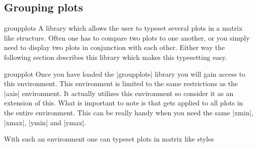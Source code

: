 \subsection{Grouping plots}
\label{sec:group:plot}

{}

%


\begin{pgfplotslibrary}{groupplots}
  A library which allows the user to typeset several plots in a matrix like structure.
  Often one has to compare two plots to one another, or you simply need to display two plots in conjunction with each other. Either way the following
  section describes this library which makes this typesetting easy.
\end{pgfplotslibrary}

\begin{environment}{{groupplot}}
  Once you have loaded the |groupplots| library you will gain access to this environment. This environment is limited to the same restrictions as the
  |axis| environment. It actually utilizes this environment so consider it as an extension of this. What is important to note is that  gets
  applied to all plots in the entire environment. This can be really handy when you need the same |xmin|, |xmax|, |ymin| and |ymax|.
\end{environment}

With such an environment one can typeset plots in matrix like styles
\begin{codeexample}[]
\end{codeexample}

